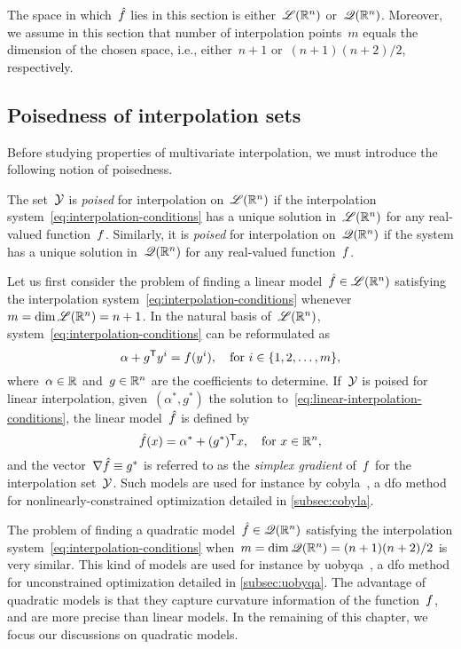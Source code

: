 The space in which~$\objm$ lies in this section is either~$\mathscr{L}(\mathbb{R}^n)$ or~$\mathscr{Q}(\mathbb{R}^n)$.
Moreover, we assume in this section that number of interpolation points~$m$ equals the dimension of the chosen space, i.e., either~$n + 1$ or~$(n + 1)(n + 2) / 2$, respectively.

\subsection{Poisedness of interpolation sets}
\label{subsec:poisedness}

Before studying properties of multivariate interpolation, we must introduce the following notion of poisedness.

\begin{definition}[Poisedness]
    The set~$\xpt$ is \emph{poised} for interpolation on~$\mathscr{L}(\mathbb{R}^n)$ if the interpolation system~\cref{eq:interpolation-conditions} has a unique solution in~$\mathscr{L}(\mathbb{R}^n)$ for any real-valued function~$f$.
    Similarly, it is \emph{poised} for interpolation on~$\mathscr{Q}(\mathbb{R}^n)$ if the system has a unique solution in~$\mathscr{Q}(\mathbb{R}^n)$ for any real-valued function~$f$.
\end{definition}

Let us first consider the problem of finding a linear model~$\objm \in \lpoly$ satisfying the interpolation system~\cref{eq:interpolation-conditions} whenever~$m = \dim \mathscr{L}(\mathbb{R}^n) = n + 1$.
In the natural basis of~$\mathscr{L}(\mathbb{R}^n)$, system~\cref{eq:interpolation-conditions} can be reformulated as
\begin{equation}
    \label{eq:linear-interpolation-conditions}
    \alpha + g^{\mathsf{T}} y^i = f(y^i), \quad \text{for~$i \in \{1, 2, \dots, m\}$},
\end{equation}
where~$\alpha \in \mathbb{R}$ and~$g \in \mathbb{R}^n$ are the coefficients to determine.
If~$\xpt$ is poised for linear interpolation, given~$(\alpha^{\ast}, g^{\ast})$ the solution to~\cref{eq:linear-interpolation-conditions}, the linear model~$\objm$ is defined by
\begin{equation*}
    \objm(\iter) = \alpha^{\ast} + (g^{\ast})^{\T} x, \quad \text{for~$\iter \in \R^n$},
\end{equation*}
and the vector~$\nabla \objm \equiv g^{\ast}$ is referred to as the \emph{simplex gradient} of~$f$ for the interpolation set~$\xpt$.
Such models are used for instance by \gls{cobyla}~\cite{Powell_1994}, a \gls{dfo} method for nonlinearly-constrained optimization detailed in \cref{subsec:cobyla}.

The problem of finding a quadratic model~$\objm \in \qpoly$ satisfying the interpolation system~\cref{eq:interpolation-conditions} when~$m = \dim \mathscr{Q}(\mathbb{R}^n) = (n + 1)(n + 2) / 2$ is very similar.
This kind of models are used for instance by \gls{uobyqa}~\cite{Powell_2002}, a \gls{dfo} method for unconstrained optimization detailed in \cref{subsec:uobyqa}.
The advantage of quadratic models is that they capture curvature information of the function~$f$, and are more precise than linear models.
In the remaining of this chapter, we focus our discussions on quadratic models.

